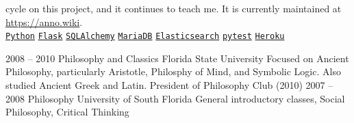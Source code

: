 \documentclass[9pt]{developercv} %
\begin{document}
\begin{entrylist}
{            cycle on this project, and it continues to teach me. It is currently
            maintained at {\href{https://anno.wiki}{https://anno.wiki}}.
        \\
        \texttt{{\href{https://www.python.org/}{Python}}}\slashsep
        \texttt{{\href{https://flask.palletsprojects.com/en/1.1.x/}{Flask}}}\slashsep
        \texttt{{\href{https://www.sqlalchemy.org/}{SQLAlchemy}}}\slashsep
        \texttt{{\href{https://mariadb.org/}{MariaDB}}}\slashsep
        \texttt{{\href{https://www.elastic.co/}{Elasticsearch}}}\slashsep
        \texttt{{\href{https://docs.pytest.org/en/stable/}{pytest}}}\slashsep
        \texttt{{\href{https://www.heroku.com/}{Heroku}}}
        }
\end{entrylist}



\begin{entrylist}
    \entry
        {2008 -- 2010}
        {Philosophy and Classics}
        {Florida State University}
        {Focused on Ancient Philosophy, particularly Aristotle, Philosphy of
        Mind, and Symbolic Logic. Also studied Ancient Greek and Latin.
        President of Philosophy Club (2010)}
    \entry
        {2007 -- 2008}
        {Philosophy}
        {University of South Florida}
        {General introductory classes, Social Philosophy, Critical Thinking}
\end{entrylist}

%
%
%
%
%
%
%
%

\end{document}
